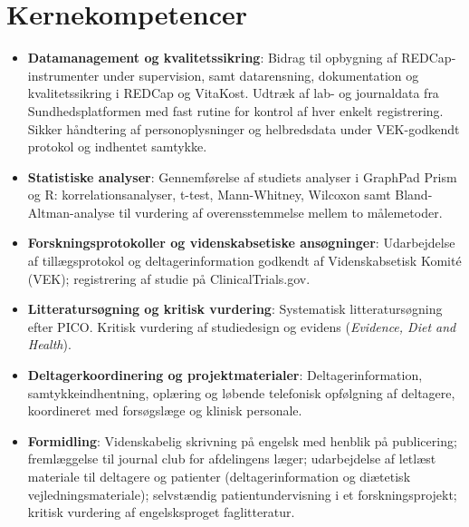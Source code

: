 \documentclass[11pt,a4paper,sans]{moderncv}
\begin{document}
\section{Kernekompetencer}
\vspace{1pt}
\begin{itemize}

\item \textbf{Datamanagement og kvalitetssikring}: Bidrag til opbygning af REDCap-instrumenter under supervision, samt datarensning, dokumentation og kvalitetssikring i REDCap og VitaKost. Udtræk af lab- og journaldata fra Sundhedsplatformen med fast rutine for kontrol af hver enkelt registrering. Sikker håndtering af personoplysninger og helbredsdata under VEK-godkendt protokol og indhentet samtykke.

\item \textbf{Statistiske analyser}: Gennemførelse af studiets analyser i GraphPad Prism og R: korrelationsanalyser, t-test, Mann-Whitney, Wilcoxon samt Bland-Altman-analyse til vurdering af overensstemmelse mellem to målemetoder.

\item \textbf{Forskningsprotokoller og videnskabsetiske ansøgninger}: Udarbejdelse af tillægsprotokol og deltagerinformation godkendt af Videnskabsetisk Komité (VEK); registrering af studie på ClinicalTrials.gov.

\item \textbf{Litteratursøgning og kritisk vurdering}: Systematisk litteratursøgning efter PICO. Kritisk vurdering af studiedesign og evidens (\emph{Evidence, Diet and Health}).

\item \textbf{Deltagerkoordinering og projektmaterialer}: Deltagerinformation, samtykkeindhentning, oplæring og løbende telefonisk opfølgning af deltagere, koordineret med forsøgslæge og klinisk personale.

\item \textbf{Formidling}: Videnskabelig skrivning på engelsk med henblik på publicering; fremlæggelse til journal club for afdelingens læger; udarbejdelse af letlæst materiale til deltagere og patienter (deltagerinformation og diætetisk vejledningsmateriale); selvstændig patientundervisning i et forskningsprojekt; kritisk vurdering af engelsksproget faglitteratur.

\end{itemize}

\end{document}
